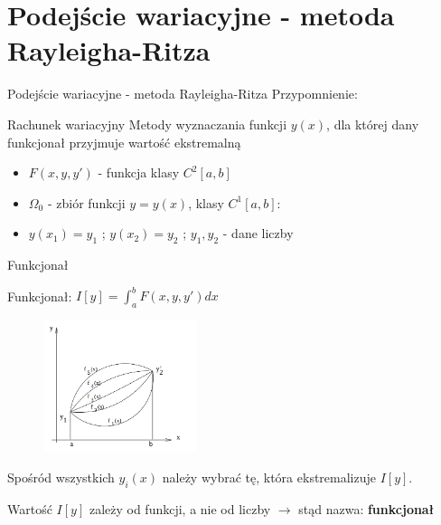 \section{Podejście wariacyjne - metoda Rayleigha-Ritza}

	
	\begin{frame}{Podejście wariacyjne - metoda Rayleigha-Ritza}
		Przypomnienie:
		
		\begin{block}{Rachunek wariacyjny}
			Metody wyznaczania funkcji $y(x)$, dla której dany funkcjonał przyjmuje wartość ekstremalną
		\end{block}
		
		\begin{itemize}
			\item $F(x,y,y')$ - funkcja klasy $C^2[a,b]$
					
			\item $\Omega_0$ - zbiór funkcji $y = y(x)$, klasy $C^1[a,b]$:
					
			\item $y(x_1) = y_1$ ; $y(x_2) = y_2$ ; $y_1, y_2$ - dane liczby
		\end{itemize}
		
	\end{frame}

	
	\begin{frame}{Funkcjonał}
		\begin{block}{Funkcjonał:}
			$I[y] = \int_a^b F(x,y,y') dx$
		\end{block}			
		\begin{figure}
			\includegraphics[width=0.4\textwidth]{img/19/functional}
		\end{figure}
		
		Spośród wszystkich $y_i(x)$ należy wybrać tę, która ekstremalizuje $I[y]$.
		
		Wartość $I[y]$ zależy od funkcji, a nie od liczby $\rightarrow$ stąd nazwa: \textbf{funkcjonał}
	\end{frame}
	
